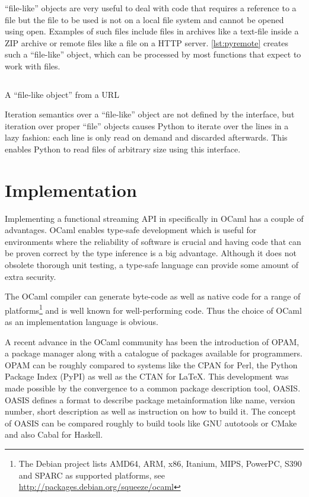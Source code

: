 \documentclass[parskip=half]{scrreprt}
\newcommand\inline[1]{{\addfontfeature{Letters=SmallCaps}#1}}
\begin{document}
\enquote{file-like} objects are very useful to deal with code that requires a
reference to a file but the file to be used is not on a local file system and
cannot be opened using \inline{open}. Examples of such files include files in
archives like a text-file inside a ZIP archive or remote files like a file on a
HTTP server. \autoref{lst:pyremote} creates such a \enquote{file-like}
object, which can be processed by most functions that expect to work with
files.

\begin{listing}[H]
  \inputminted[linenos]{python}{remote.py}
  \caption{A \enquote{file-like object} from a URL}
  \label{lst:pyremote}
\end{listing}

Iteration semantics over a \enquote{file-like} object are not defined by the
interface, but iteration over proper \enquote{file} objects causes Python to
iterate over the lines in a lazy fashion: each line is only read on demand and
discarded afterwards. This enables Python to read files of arbitrary size using
this interface.

\chapter{Implementation}
\label{sec:implementation}

Implementing a functional streaming API in specifically in OCaml has a couple
of advantages. OCaml enables type-safe development which is useful for
environments where the reliability of software is crucial and having code that
can be proven correct by the type inference is a big advantage. Although it
does not obsolete thorough unit testing, a type-safe language can provide some
amount of extra security.

The OCaml compiler can generate byte-code as well as native code for a range of
platforms\footnote{The Debian project lists AMD64, ARM, x86, Itanium, MIPS,
PowerPC, S390 and SPARC as supported platforms, see
\url{http://packages.debian.org/squeeze/ocaml}} and is well known for
well-performing code. Thus the choice of OCaml as an implementation language is
obvious.

A recent advance in the OCaml community has been the introduction of OPAM, a
package manager along with a catalogue of packages available for programmers.
OPAM can be roughly compared to systems like the CPAN for Perl, the Python
Package Index (PyPI) as well as the CTAN for \LaTeX. This development was made
possible by the convergence to a common package description tool, OASIS. OASIS
defines a format to describe package metainformation like name, version number,
short description as well as instruction on how to build it. The concept of
OASIS can be compared roughly to build tools like GNU autotools or CMake and
also Cabal for Haskell.
\end{document}
